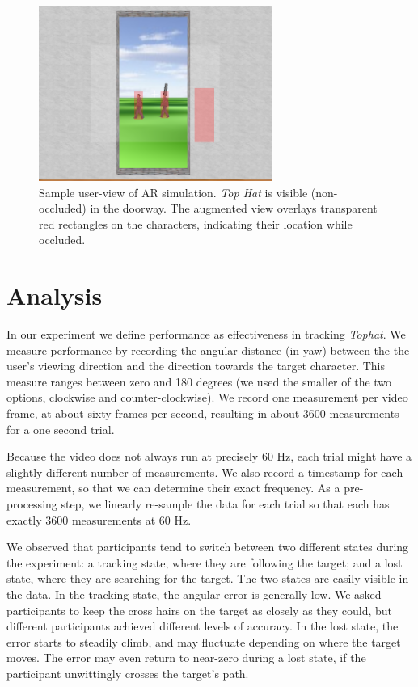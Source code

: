 \documentclass{acmsiggraph}                     %
\begin{document}
\begin{figure}[t]
	\centering
	\includegraphics[width=3in]{figures/tophatscreenshot.png}
	\caption{Sample user-view of AR simulation.  \emph{Top Hat} is visible (non-occluded) in the doorway.  The augmented view overlays transparent red rectangles on the characters, indicating their location while occluded.}
\end{figure}

\section{Analysis}

In our experiment we define performance as effectiveness in tracking \emph{Tophat}.  We measure performance by recording the angular distance (in yaw) between the the user's viewing direction and the direction towards the target character.  This measure ranges between zero and 180 degrees (we used the smaller of the two options, clockwise and counter-clockwise).  We record one measurement per video frame, at about sixty frames per second, resulting in about 3600 measurements for a one second trial.

Because the video does not always run at precisely 60 Hz, each trial might have a slightly different number of measurements.  We also record a timestamp for each measurement, so that we can determine their exact frequency.  As a pre-processing step, we linearly re-sample the data for each trial so that each has exactly 3600 measurements at 60 Hz.

We observed that participants tend to switch between two different states during the experiment: a tracking state, where they are following the target; and a lost state, where they are searching for the target.  The two states are easily visible in the data.  In the tracking state, the angular error is generally low.  We asked participants to keep the cross hairs on the target as closely as they could, but different participants achieved different levels of accuracy.  In the lost state, the error starts to steadily climb, and may fluctuate depending on where the target moves.  The error may even return to near-zero during a lost state, if the participant unwittingly crosses the target's path.
\end{document}
